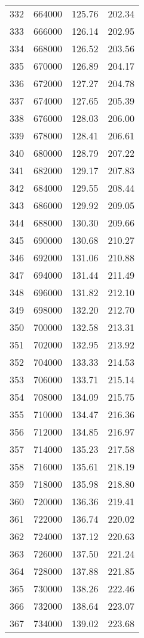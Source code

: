 \documentclass{article}
\begin{document}
\begin{longtable}{@{}l l l l}
332 & 664000 & 125.76 & 202.34\\
333 & 666000 & 126.14 & 202.95\\
334 & 668000 & 126.52 & 203.56\\
335 & 670000 & 126.89 & 204.17\\
336 & 672000 & 127.27 & 204.78\\
337 & 674000 & 127.65 & 205.39\\
338 & 676000 & 128.03 & 206.00\\
339 & 678000 & 128.41 & 206.61\\
340 & 680000 & 128.79 & 207.22\\
341 & 682000 & 129.17 & 207.83\\
342 & 684000 & 129.55 & 208.44\\
343 & 686000 & 129.92 & 209.05\\
344 & 688000 & 130.30 & 209.66\\
345 & 690000 & 130.68 & 210.27\\
346 & 692000 & 131.06 & 210.88\\
347 & 694000 & 131.44 & 211.49\\
348 & 696000 & 131.82 & 212.10\\
349 & 698000 & 132.20 & 212.70\\
350 & 700000 & 132.58 & 213.31\\
351 & 702000 & 132.95 & 213.92\\
352 & 704000 & 133.33 & 214.53\\
353 & 706000 & 133.71 & 215.14\\
354 & 708000 & 134.09 & 215.75\\
355 & 710000 & 134.47 & 216.36\\
356 & 712000 & 134.85 & 216.97\\
357 & 714000 & 135.23 & 217.58\\
358 & 716000 & 135.61 & 218.19\\
359 & 718000 & 135.98 & 218.80\\
360 & 720000 & 136.36 & 219.41\\
361 & 722000 & 136.74 & 220.02\\
362 & 724000 & 137.12 & 220.63\\
363 & 726000 & 137.50 & 221.24\\
364 & 728000 & 137.88 & 221.85\\
365 & 730000 & 138.26 & 222.46\\
366 & 732000 & 138.64 & 223.07\\
367 & 734000 & 139.02 & 223.68\\

\end{longtable}
\end{document}
